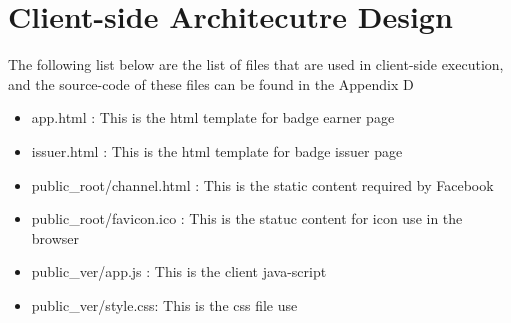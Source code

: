 \section{Client-side Architecutre Design}
The following list below are the list of files that are used in client-side execution, and the source-code of these files can be found in the Appendix D

\begin{itemize}
\item app.html : This is the html template for badge earner page
\item issuer.html : This is the html template for badge issuer page
\item public{\_}root/channel.html : This is the static content required by Facebook 
\item public{\_}root/favicon.ico : This is the statuc content for icon use in the browser
\item public{\_}ver/app.js : This is the client java-script  
\item public{\_}ver/style.css: This is the css file use
\end{itemize}





